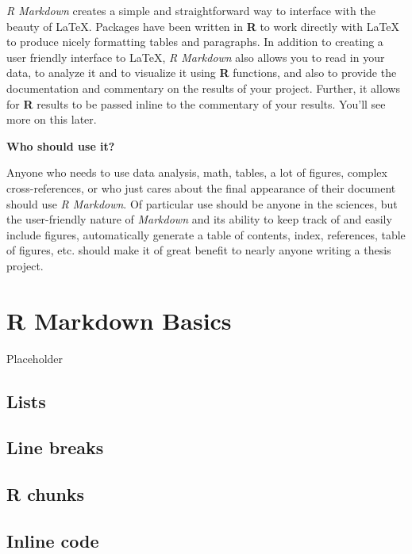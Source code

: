 \documentclass[twoside,12pt,final]{ucthesis-CA2012}
\begin{document}
\begin{ucmainmatter}
\emph{R Markdown} creates a simple and straightforward way to interface with the beauty of LaTeX. Packages have been written in \textbf{R} to work directly with LaTeX to produce nicely formatting tables and paragraphs. In addition to creating a user friendly interface to LaTeX, \emph{R Markdown} also allows you to read in your data, to analyze it and to visualize it using \textbf{R} functions, and also to provide the documentation and commentary on the results of your project. Further, it allows for \textbf{R} results to be passed inline to the commentary of your results. You'll see more on this later.

\textbf{Who should use it?}

Anyone who needs to use data analysis, math, tables, a lot of figures, complex cross-references, or who just cares about the final appearance of their document should use \emph{R Markdown}. Of particular use should be anyone in the sciences, but the user-friendly nature of \emph{Markdown} and its ability to keep track of and easily include figures, automatically generate a table of contents, index, references, table of figures, etc. should make it of great benefit to nearly anyone writing a thesis project.

\hypertarget{rmd-basics}{%
\chapter{R Markdown Basics}\label{rmd-basics}}

Placeholder

\hypertarget{lists}{%
\section{Lists}\label{lists}}

\hypertarget{line-breaks}{%
\section{Line breaks}\label{line-breaks}}

\hypertarget{r-chunks}{%
\section{R chunks}\label{r-chunks}}

\hypertarget{inline-code}{%
\section{Inline code}\label{inline-code}}


\end{ucmainmatter}
\end{document}
